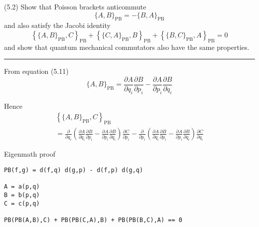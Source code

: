 \documentclass[12pt]{article}
\begin{document}
(5.2)
Show that Poisson brackets anticommute
\begin{equation*}
\{A,B\}_\mathrm{PB}=-\{B,A\}_\mathrm{PB}
\tag{5.59}
\end{equation*}
and also satisfy the Jacobi identity
\begin{equation*}
\left\{\{A,B\}_\mathrm{PB},C\right\}_\mathrm{PB}
+\left\{\{C,A\}_\mathrm{PB},B\right\}_\mathrm{PB}
+\left\{\{B,C\}_\mathrm{PB},A\right\}_\mathrm{PB}
=0
\tag{5.60}
\end{equation*}
and show that quantum mechanical commutators
also have the same properties.

\bigskip
\hrule

\bigskip
From equation (5.11)
\begin{equation*}
\{A,B\}_\mathrm{PB}
=\frac{\partial A}{\partial q_i}\frac{\partial B}{\partial p_i}
-\frac{\partial A}{\partial p_i}\frac{\partial B}{\partial q_i}
\tag{5.11}
\end{equation*}

Hence
\begin{multline*}
\left\{\{A,B\}_\mathrm{PB},C\right\}_\mathrm{PB}
\\
{}=\frac{\partial}{\partial q_i}
\left(
\frac{\partial A}{\partial q_i}\frac{\partial B}{\partial p_i}
-\frac{\partial A}{\partial p_i}\frac{\partial B}{\partial q_i}
\right)
\frac{\partial C}{\partial p_i}
-\frac{\partial}{\partial p_i}
\left(
\frac{\partial A}{\partial q_i}\frac{\partial B}{\partial p_i}
-\frac{\partial A}{\partial p_i}\frac{\partial B}{\partial q_i}
\right)
\frac{\partial C}{\partial q_i}
\end{multline*}

Eigenmath proof
\begin{verbatim}
PB(f,g) = d(f,q) d(g,p) - d(f,p) d(g,q)

A = a(p,q)
B = b(p,q)
C = c(p,q)

PB(PB(A,B),C) + PB(PB(C,A),B) + PB(PB(B,C),A) == 0
\end{verbatim}
\end{document}
